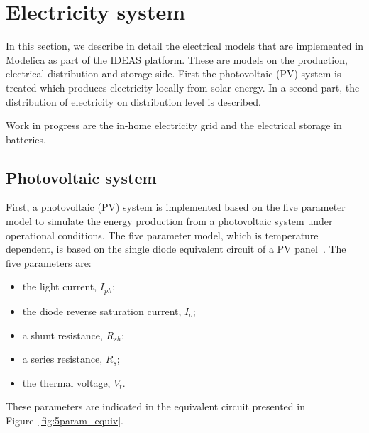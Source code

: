 
\chapter{Electricity system}



In this section, we describe in detail the electrical models that are implemented in Modelica as part of the IDEAS platform. These are models on the production, electrical distribution and storage side. First the photovoltaic (PV) system is treated which produces electricity locally from solar energy. In a second part, the distribution of electricity on distribution level is described.

Work in progress are the in-home electricity grid and the electrical storage in batteries.

\section{Photovoltaic system}
First, a photovoltaic (PV) system is implemented based on the five parameter model to simulate the energy production from a photovoltaic system under operational conditions. The five parameter model, which is temperature dependent, is based on the single diode equivalent circuit of a PV panel~\cite{desoto,sera}. The five parameters are:
\begin{itemize}
\item the light current, $I_{ph}$;
\item the diode reverse saturation current, $I_{o}$;
\item a shunt resistance, $R_{sh}$;
\item a series resistance, $R_{s}$;
\item the thermal voltage, $V_{t}$.
\end{itemize} 
These parameters are indicated in the equivalent circuit presented in Figure~\ref{fig:5param_equiv}.

